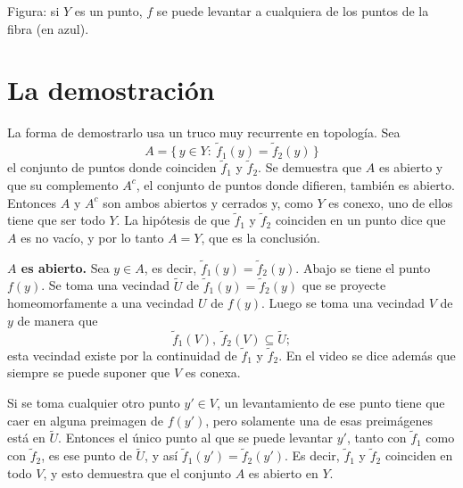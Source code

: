 \documentclass[11pt]{article}
\begin{document}
\noindent Figura: si $Y$ es un punto, $f$ se puede levantar a cualquiera de los puntos de la fibra (en azul).

\section*{La demostración}

La forma de demostrarlo usa un truco muy recurrente en topología. Sea
\[
  A=\{\,y\in Y:\ \tilde f_1(y)=\tilde f_2(y)\,\}
\]
el conjunto de puntos donde coinciden $\tilde f_1$ y $\tilde f_2$. Se demuestra que $A$ es abierto y que su complemento $A^c$, el conjunto de puntos donde difieren, también es abierto. Entonces $A$ y $A^c$ son ambos abiertos y cerrados y, como $Y$ es conexo, uno de ellos tiene que ser todo $Y$. La hipótesis de que $\tilde f_1$ y $\tilde f_2$ coinciden en un punto dice que $A$ es no vacío, y por lo tanto $A=Y$, que es la conclusión.

\medskip\noindent\textbf{$A$ es abierto.} Sea $y\in A$, es decir, $\tilde f_1(y)=\tilde f_2(y)$. Abajo se tiene el punto $f(y)$. Se toma una vecindad $\tilde U$ de $\tilde f_1(y)=\tilde f_2(y)$ que se proyecte homeomorfamente a una vecindad $U$ de $f(y)$. Luego se toma una vecindad $V$ de $y$ de manera que
\[
  \tilde f_1(V),\ \tilde f_2(V)\subseteq\tilde U;
\]
esta vecindad existe por la continuidad de $\tilde f_1$ y $\tilde f_2$. En el video se dice además que siempre se puede suponer que $V$ es conexa.

Si se toma cualquier otro punto $y'\in V$, un levantamiento de ese punto tiene que caer en alguna preimagen de $f(y')$, pero solamente una de esas preimágenes está en $\tilde U$. Entonces el único punto al que se puede levantar $y'$, tanto con $\tilde f_1$ como con $\tilde f_2$, es ese punto de $\tilde U$, y así $\tilde f_1(y')=\tilde f_2(y')$. Es decir, $\tilde f_1$ y $\tilde f_2$ coinciden en todo $V$, y esto demuestra que el conjunto $A$ es abierto en $Y$.
\end{document}
